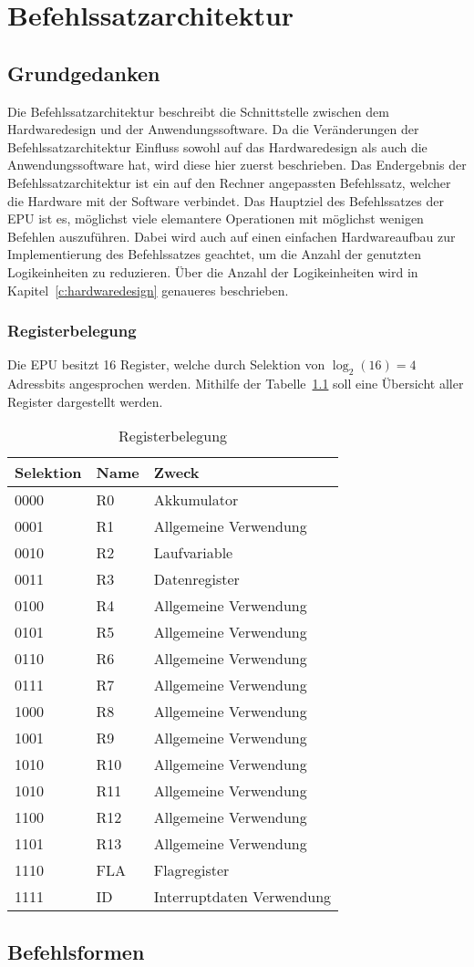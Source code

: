 \chapter{Befehlssatzarchitektur}
\label{c:befehlssatzarchitektur}
\section{Grundgedanken}
Die Befehlssatzarchitektur beschreibt die Schnittstelle zwischen dem
Hardwaredesign und der Anwendungssoftware. Da die Veränderungen der
Befehlssatzarchitektur Einfluss sowohl auf das Hardwaredesign als auch die
Anwendungssoftware hat, wird diese hier zuerst beschrieben. Das Endergebnis der
Befehlssatzarchitektur ist ein auf den Rechner angepassten Befehlssatz, welcher
die Hardware mit der Software verbindet. Das Hauptziel des Befehlssatzes der EPU
ist es, möglichst viele elemantere Operationen mit möglichst wenigen Befehlen
auszuführen. Dabei wird auch auf einen einfachen Hardwareaufbau zur
Implementierung des Befehlssatzes geachtet, um die Anzahl der genutzten
Logikeinheiten zu reduzieren. Über die Anzahl der Logikeinheiten wird in 
Kapitel~\ref{c:hardwaredesign} genaueres beschrieben.
\subsection{Registerbelegung}
Die \ac{EPU} besitzt 16 Register, welche durch Selektion von $\log_2(16) = 4$
Adressbits angesprochen werden. Mithilfe der Tabelle~\ref{tab:registerbelegung}
soll eine Übersicht aller Register dargestellt werden.

\begin{table}[h]
\centering
\begin{tabular}{lll}
\toprule
Selektion & Name & Zweck\\
\midrule
0000 & R0  & Akkumulator\\
0001 & R1  & Allgemeine Verwendung\\
0010 & R2  & Laufvariable\\
0011 & R3  & Datenregister\\
0100 & R4  & Allgemeine Verwendung\\
0101 & R5  & Allgemeine Verwendung\\
0110 & R6  & Allgemeine Verwendung\\
0111 & R7  & Allgemeine Verwendung\\
1000 & R8  & Allgemeine Verwendung\\
1001 & R9  & Allgemeine Verwendung\\
1010 & R10 & Allgemeine Verwendung\\
1010 & R11 & Allgemeine Verwendung\\
1100 & R12 & Allgemeine Verwendung\\
1101 & R13 & Allgemeine Verwendung\\
1110 & FLA & Flagregister\\
1111 & ID  & Interruptdaten Verwendung\\
\bottomrule
\end{tabular}
\caption{Registerbelegung}
\label{tab:registerbelegung}
\end{table}
\clearpage
\section{Befehlsformen}
